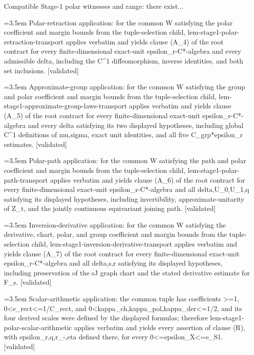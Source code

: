 \documentclass{article}
\newcommand{\step}[1]{\par\noindent\hangindent=3.5em\hangafter=1%
  \makebox[3.5em][l]{\textbf{#1.}}}
\newcommand{\steptag}[1]{\hfill{\small\textsf{[#1]}}}
\begin{document}
\begin{proofbox}{Compatible Stage-1 polar witnesses and range: there exist...}
\step{1.1.5} Polar-retraction application: for the common W satisfying the polar coefficient and margin bounds from the tuple-selection child, lem-stage1-polar-retraction-transport applies verbatim and yields clause (A\_4) of the root contract for every finite-dimensional exact-unit epsilon\_r-C*-algebra and every admissible delta, including the C\textasciicircum{}1 diffeomorphism, inverse identities, and both set inclusions. \steptag{validated} \\[4pt]
\step{1.1.6} Approximate-group application: for the common W satisfying the group and polar coefficient and margin bounds from the tuple-selection child, lem-stage1-approximate-group-laws-transport applies verbatim and yields clause (A\_5) of the root contract for every finite-dimensional exact-unit epsilon\_r-C*-algebra and every delta satisfying its two displayed hypotheses, including global C\textasciicircum{}1 definitions of mu,sigma, exact unit identities, and all five C\_grp*epsilon\_r estimates. \steptag{validated} \\[4pt]
\step{1.1.7} Polar-path application: for the common W satisfying the path and polar coefficient and margin bounds from the tuple-selection child, lem-stage1-polar-path-transport applies verbatim and yields clause (A\_6) of the root contract for every finite-dimensional exact-unit epsilon\_r-C*-algebra and all delta,U\_0,U\_1,q satisfying its displayed hypotheses, including invertibility, approximate-unitarity of Z\_t, and the jointly continuous equivariant joining path. \steptag{validated} \\[4pt]
\step{1.1.8} Inversion-derivative application: for the common W satisfying the derivative, chart, polar, and group coefficient and margin bounds from the tuple-selection child, lem-stage1-inversion-derivative-transport applies verbatim and yields clause (A\_7) of the root contract for every finite-dimensional exact-unit epsilon\_r-C*-algebra and all delta,s,r satisfying its displayed hypotheses, including preservation of the sJ graph chart and the stated derivative estimate for F\_s. \steptag{validated} \\[4pt]
\step{1.1.9} Scalar-arithmetic application: the common tuple has coefficients >=1, 0<e\_rect<=1/C\_rect, and 0<kappa\_ch,kappa\_pol,kappa\_der<=1/2, and its four derived scales were defined by the displayed formulas; therefore lem-stage1-polar-scalar-arithmetic applies verbatim and yields every assertion of clause (R), with epsilon\_r,q,r\_-,eta defined there, for every 0<=epsilon\_X<=e\_S1. \steptag{validated} \\[4pt]
\end{proofbox}
\end{document}
